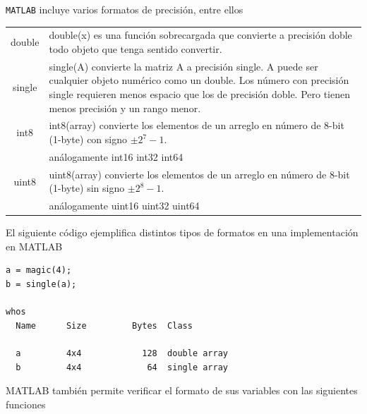 \documentclass[12pt,letterpaper]{article}
\begin{document}
\texttt{MATLAB} incluye varios formatos de precisi\'on, entre ellos 

\begin{longtable}{|c||p{}|}
\hline
double	& double(x) es una funci\'on sobrecargada que convierte a precisi\'on doble todo objeto que tenga sentido convertir. \\
single 	& single(A) convierte la matriz A a precisi\'on single. A puede ser cualquier objeto num\'erico como un double. Los n\'umero con precisi\'on single requieren menos espacio que los de precisi\'on doble. Pero tienen menos precisi\'on y un rango menor.\\
int8 	& int8(array) convierte los elementos de un arreglo en n\'umero de 8-bit (1-byte)  con signo $\pm 2^7-1$. \\	
& an\'alogamente 
int16	
int32
int64\\
uint8 & uint8(array) convierte los elementos de un arreglo en n\'umero de 8-bit (1-byte)  sin signo $\pm 2^8-1$. \\	
& an\'alogamente 
uint16
uint32
uint64\\
\hline
\end{longtable}

El siguiente c\'odigo ejemplifica distintos tipos de formatos en una implementaci\'on en MATLAB

\begin{verbatim}
a = magic(4);
b = single(a);

whos
  Name      Size         Bytes  Class

  a         4x4            128  double array
  b         4x4             64  single array
\end{verbatim}

MATLAB tambi\'en permite verificar el formato de sus variables con las siguientes funciones 
\end{document}
